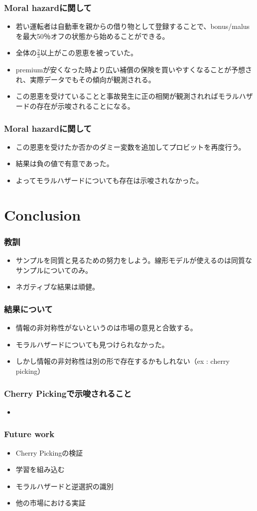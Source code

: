 \documentclass[dvipdfmx, 12pt]{beamer}
\begin{document}
\begin{frame}\frametitle{Moral hazardに関して}
	\begin{itemize}
	\item 若い運転者は自動車を親からの借り物として登録することで、bonus/malusを最大50％オフの状態から始めることができる。
	\item 全体の$\frac{2}{3}$以上がこの恩恵を被っていた。
	\item premiumが安くなった時より広い補償の保険を買いやすくなることが予想され、実際データでもその傾向が観測される。
	\item この恩恵を受けていることと事故発生に正の相関が観測されればモラルハザードの存在が示唆されることになる。
	\end{itemize}
\end{frame}

\begin{frame}\frametitle{Moral hazardに関して}
	\begin{itemize}
	\item この恩恵を受けたか否かのダミー変数を追加してプロビットを再度行う。
	\item 結果は負の値で有意であった。
	\item よってモラルハザードについても存在は示唆されなかった。
	\end{itemize}
\end{frame}

\section{Conclusion}
\begin{frame}\frametitle{教訓}
	\begin{itemize}
	\item サンプルを同質と見るための努力をしよう。線形モデルが使えるのは同質なサンプルについてのみ。
	\item ネガティブな結果は頑健。
	\end{itemize}
\end{frame}

\begin{frame}\frametitle{結果について}
	\begin{itemize}
	\item 情報の非対称性がないというのは市場の意見と合致する。
	\item モラルハザードについても見つけられなかった。
	\item しかし情報の非対称性は別の形で存在するかもしれない（ex : cherry picking）
	\end{itemize}
\end{frame}

\begin{frame}\frametitle{Cherry Pickingで示唆されること}
	\begin{itemize}
	\item 
	\end{itemize}
\end{frame}

\begin{frame}\frametitle{Future work}
	\begin{itemize}
	\item Cherry Pickingの検証
	\item 学習を組み込む
	\item モラルハザードと逆選択の識別
	\item 他の市場における実証
	\end{itemize}
\end{frame}
\end{document}
